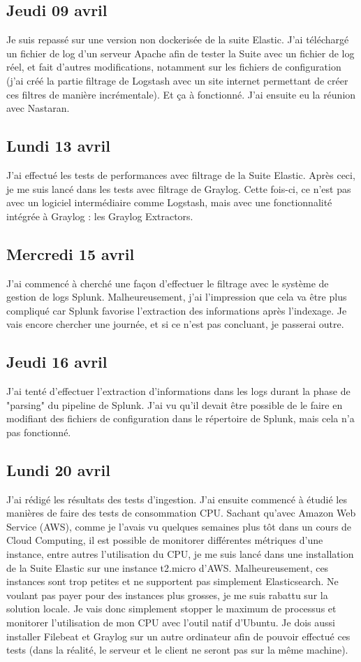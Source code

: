 \documentclass[paper=a4, fontsize=11pt]{scrartcl}
\begin{document}
\subsection{Jeudi 09 avril}
    Je suis repassé sur une version non dockerisée de la suite Elastic. J'ai téléchargé un fichier de log d'un serveur Apache afin de tester la Suite avec un fichier de log réel, et fait d'autres modifications, notamment sur les fichiers de configuration (j'ai créé la partie \og filtrage \fg de Logstash avec un site internet permettant de créer ces filtres de manière incrémentale). Et ça à fonctionné. J'ai ensuite eu la réunion avec Nastaran.
\subsection{Lundi 13 avril}
    J'ai effectué les tests de performances avec filtrage de la Suite Elastic. Après ceci, je me suis lancé dans les tests avec filtrage de Graylog. Cette fois-ci, ce n'est pas avec un logiciel intermédiaire comme Logstash, mais avec une fonctionnalité intégrée à Graylog : les Graylog Extractors.
\subsection{Mercredi 15 avril}
    J'ai commencé à cherché une façon d'effectuer le filtrage avec le système de gestion de logs Splunk. Malheureusement, j'ai l'impression que cela va être plus compliqué car Splunk favorise l'extraction des informations après l'indexage. Je vais encore chercher une journée, et si ce n'est pas concluant, je passerai outre.
\subsection{Jeudi 16 avril}
    J'ai tenté d'effectuer l'extraction d'informations dans les logs durant la phase de "parsing" du pipeline de Splunk. J'ai vu qu'il devait être possible de le faire en modifiant des fichiers de configuration dans le répertoire de Splunk, mais cela n'a pas fonctionné.
\subsection{Lundi 20 avril}
    J'ai rédigé les résultats des tests d'ingestion. J'ai ensuite commencé à étudié les manières de faire des tests de consommation CPU. Sachant qu'avec Amazon Web Service (AWS), comme je l'avais vu quelques semaines plus tôt dans un cours de Cloud Computing, il est possible de monitorer différentes métriques d'une instance, entre autres l'utilisation du CPU, je me suis lancé dans une installation de la Suite Elastic sur une instance t2.micro d'AWS. Malheureusement, ces instances sont trop petites et ne supportent pas simplement Elasticsearch. Ne voulant pas payer pour des instances plus grosses, je me suis rabattu sur la solution locale. Je vais donc simplement stopper le maximum de processus et monitorer l'utilisation de mon CPU avec l'outil natif d'Ubuntu. Je dois aussi installer Filebeat et Graylog sur un autre ordinateur afin de pouvoir effectué ces tests (dans la réalité, le serveur et le client ne seront pas sur la même machine).
\end{document}
